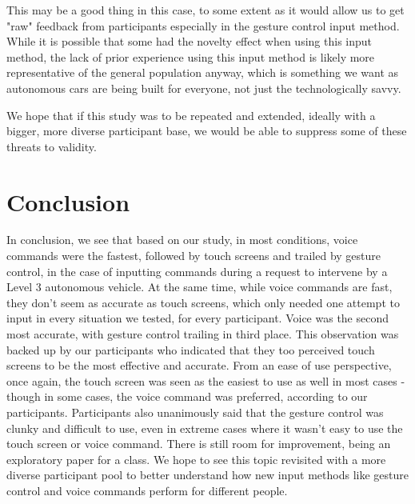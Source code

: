\documentclass{sigchi}
\begin{document}
\begin{itemize}
This may be a good thing in this case, to some extent as it would allow us to get "raw" feedback from participants especially in the gesture control input method. While it is possible that some had the novelty effect when using this input method, the lack of prior experience using this input method is likely more representative of the general population anyway, which is something we want as autonomous cars are being built for everyone, not just the technologically savvy.
\end{itemize}

We hope that if this study was to be repeated and extended, ideally with a bigger, more diverse participant base, we would be able to suppress some of these threats to validity.

\section{Conclusion}

In conclusion, we see that based on our study, in most conditions, voice commands were the fastest, followed by touch screens and trailed by gesture control, in the case of inputting commands during a request to intervene by a Level 3 autonomous vehicle. At the same time, while voice commands are fast, they don't seem as accurate as touch screens, which only needed one attempt to input in every situation we tested, for every participant. Voice was the second most accurate, with gesture control trailing in third place. This observation was backed up by our participants who indicated that they too perceived touch screens to be the most effective and accurate. From an ease of use perspective, once again, the touch screen was seen as the easiest to use as well in most cases - though in some cases, the voice command was preferred, according to our participants. Participants also unanimously said that the gesture control was clunky and difficult to use, even in extreme cases where it wasn't easy to use the touch screen or voice command. There is still room for improvement, being an exploratory paper for a class. We hope to see this topic revisited with a more diverse participant pool to better understand how new input methods like gesture control and voice commands perform for different people.


%
{\footnotesize 
}

 
\end{document}
